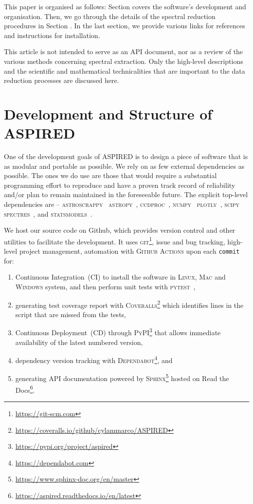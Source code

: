 \documentclass[twocolumn, linenumbers]{aastex631}
\begin{document}
This paper is organised as follows: Section  covers the software's development and
organisation. Then, we go through the details of the spectral reduction
procedures in Section . In the last section, we provide various links
for references and instructions for installation.

This article is not intended to serve as an API document, nor as a review of the
various methods concerning spectral extraction. Only the high-level
descriptions and the scientific and mathematical technicalities that are
important to the data reduction processes are discussed here.

\section{Development and Structure of \textsc{ASPIRED}}

One of the development goals of \textsc{ASPIRED} is to design a piece of software that is as
modular and portable as possible. We rely on as few external dependencies as possible.
The ones we do use are those that would require a substantial programming effort to reproduce and have a
proven track record of reliability and/or plan to remain maintained in the
foreseeable future. The explicit top-level dependencies are --
\textsc{astroscrappy}~\citep{curtis_mccully_2018_1482019, 2001PASP..113.1420V}
\textsc{astropy}~\citep{astropy:2013, astropy:2018},
\textsc{ccdproc}~\citep{matt_craig_2017_1069648},
\textsc{numpy}~\citep{2020NumPy-Array}
\textsc{plotly}~\citep{plotly},
\textsc{scipy}~\citep{2020SciPy-NMeth}
\textsc{spectres}~\citep{2017arXiv170505165C}, and
\textsc{statsmodels}~\citep{seabold2010statsmodels}. 

We host our source code on Github, which provides version control and other
utilities to facilitate the development. It uses \textsc{git}\footnote{\url{https://git-scm.com}},
issue and bug tracking, high-level project management, automation with \textsc{Github Actions}
upon each \texttt{commit} for:

\begin{enumerate}
    \item Continuous Integration~(CI) to install the software in \textsc{Linux}, \textsc{Mac} and \textsc{Windows} system, and then perform unit tests with \textsc{pytest}~\citep{pytest6.2},
    \item generating test coverage report with \textsc{Coveralls}\footnote{\url{https://coveralls.io/github/cylammarco/ASPIRED}} which identifies lines in the script that are missed from the tests,
    \item Continuous Deployment~(CD) through \textsc{PyPI}\footnote{\url{https://pypi.org/project/aspired}} that allows immediate availability of the latest numbered version,
    \item dependency version tracking with \textsc{Dependabot}\footnote{\url{https://dependabot.com}}, and
    \item generating API documentation powered by \textsc{Sphinx}\footnote{\url{https://www.sphinx-doc.org/en/master}} hosted on Read the Docs\footnote{\url{https://aspired.readthedocs.io/en/latest}}.
\end{enumerate}
\end{document}

